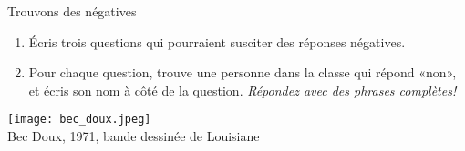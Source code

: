 \begin{frame}{Trouvons des négatives}
  \begin{enumerate}
    \item Écris trois questions qui pourraient susciter  des réponses négatives.
    \item<2-> Pour chaque question, trouve une personne dans la classe qui répond «non», et écris son nom à côté de la question. \emph{Répondez avec des phrases complètes!}
  \end{enumerate}
  \begin{center}
    \footnotesize
    \texttt{[image: bec\_doux.jpeg]} \\
    Bec Doux, 1971, bande dessinée de Louisiane
  \end{center}
\end{frame}